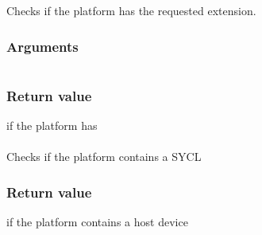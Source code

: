 \documentclass[letterpaper,10pt,english]{sphinxmanual}
\begin{document}
Checks if the platform has the requested extension.
\subsubsection*{Arguments}


\begin{savenotes}\sphinxattablestart
\centering
\begin{tabulary}{\linewidth}[t]{|T|T|}
\hline

&\\
\hline
\end{tabulary}
\par
\sphinxattableend\end{savenotes}
\subsubsection*{Return value}

 if the platform has 


\paragraph{}
\label{\detokenize{programming-interface/runtime/platform:is-host}}
\begin{sphinxVerbatim}[commandchars=\\\{\}]
  
\end{sphinxVerbatim}

Checks if the platform contains a SYCL {\hyperref[\detokenize{glossary:term-host-device}]{}}
\subsubsection*{Return value}

 if the platform contains a host device


\paragraph{}
\label{\detokenize{programming-interface/runtime/platform:get-platforms}}
\begin{sphinxVerbatim}[commandchars=\\\{\}]
  
\end{sphinxVerbatim}
\end{document}
